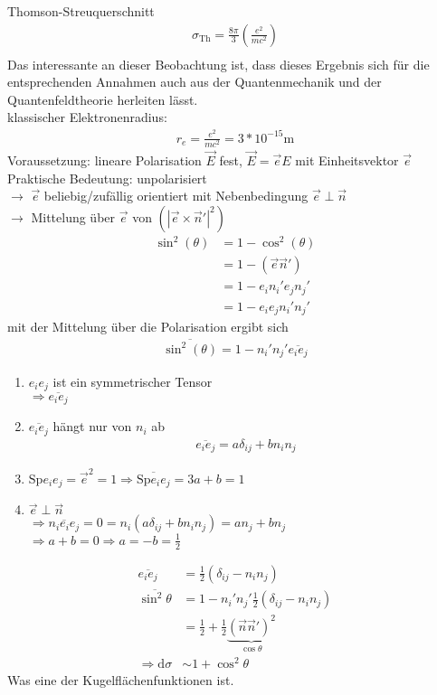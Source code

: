 \documentclass[a4paper]{article}
\begin{document}
Thomson-Streuquerschnitt
\begin{align}
\sigma_{\text{Th}}=\frac{8\pi}{3}\left( \frac{e^2}{mc^2} \right)\\
\end{align}
Das interessante an dieser Beobachtung ist, dass dieses Ergebnis sich für die
entsprechenden Annahmen auch aus der Quantenmechanik und der Quantenfeldtheorie
herleiten lässt.\\
klassischer Elektronenradius:\\
\begin{align}
r_e=\frac{e^2}{mc^2}=3*10^{-15}\mathrm{m}
\end{align}
Voraussetzung: lineare Polarisation
$\vec{E}$ fest, $\vec{E}=\vec{e}E$ mit Einheitsvektor $\vec{e}$\\
Praktische Bedeutung: unpolarisiert\\
$\longrightarrow$ $\vec{e}$ beliebig/zufällig orientiert mit Nebenbedingung
$\vec{e}\perp\vec{n}$\\
$\longrightarrow$ Mittelung über $\vec{e}$ von $\left( |\vec{e}\times\vec{n}'|^2
\right)$
\begin{align}
\sin^2(\theta)&=1-\cos^2(\theta)\\
&=1-(\vec{e}\vec{n}')\\
&=1-e_i {n_i}'e_j {n_j}'\\
&=1-e_ie_j {n_i}'{n_j}'
\end{align}
mit der Mittelung über die Polarisation ergibt sich
\begin{align}
\overline{\sin^2(\theta)}=1-{n_i}'{n_j}' \overline{e_ie_j}
\end{align}
\begin{enumerate}
  \item $e_ie_j$ ist ein symmetrischer Tensor \\ $\Rightarrow\overline{e_ie_j}$
  \item $\overline{e_ie_j}$ hängt nur von $n_i$ ab
 	\begin{align}
		\overline{e_ie_j}=a\delta_{ij}+bn_in_j
	\end{align}
 \item $\mathrm{Sp}e_ie_j=\vec{e}^2=1
 \Rightarrow\overline{\mathrm{Sp}e_ie_j}=3a+b=1$
 \item $\vec{e}\perp\vec{n}$\\ $\Rightarrow \overline{n_ie_ie_j}=0
 =n_i(a\delta_{ij}+bn_in_j)=an_j+bn_j$ \\ $\Rightarrow a+b=0 \Rightarrow
 a=-b=\frac{1}{2}$
\end{enumerate}
\begin{align}
\overline{e_ie_j}&=\frac{1}{2}\left(\delta_{ij}-n_in_j \right)\\
\overline{\sin^2\theta}&=1-{n_i}'{n_j}'\frac{1}{2}\left(\delta_{ij}-n_in_j
\right)\\
&=\frac{1}{2}+\frac{1}{2}\underbrace{\left( \vec{n}\vec{n}'
\right)^2}_{\cos\theta}\\
\Rightarrow \mathrm{d}\sigma&\sim1+\cos^2\theta
\end{align}
Was eine der Kugelflächenfunktionen ist.
\end{document}
